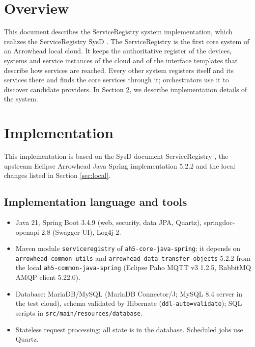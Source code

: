 \documentclass[a4paper]{arrowhead}
\begin{document}
\section{Overview}
\label{sec:overview}

This document describes the ServiceRegistry system implementation, which realizes the ServiceRegistry SysD \cite{sr-sysd}. The ServiceRegistry is the first core system of an Arrowhead local cloud. It keeps the authoritative register of the devices, systems and service instances of the cloud and of the interface templates that describe how services are reached. Every other system registers itself and its services there and finds the core services through it; orchestrators use it to discover candidate providers.
In Section \ref{Implementation}, we describe implementation details of the system.

\newpage

\section{Implementation}
\label{Implementation}

This implementation is based on the SysD document ServiceRegistry \cite{sr-sysd}, the upstream Eclipse Arrowhead Java Spring implementation 5.2.2 \cite{ah5java} and the local changes listed in Section \ref{sec:local}.

\subsection{Implementation language and tools}
\begin{itemize}
\item Java 21, Spring Boot 3.4.9 (web, security, data JPA, Quartz), springdoc-openapi 2.8 (Swagger UI), Log4j 2.
\item Maven module \texttt{serviceregistry} of \texttt{ah5-core-java-spring}; it depends on \texttt{arrowhead-common-utils} and \texttt{arrowhead-data-transfer-objects} 5.2.2 from the local \texttt{ah5-common-java-spring} (Eclipse Paho MQTT v3 1.2.5, RabbitMQ AMQP client 5.22.0).
\item Database: MariaDB/MySQL (MariaDB Connector/J; MySQL 8.4 server in the test cloud), schema validated by Hibernate (\texttt{ddl-auto=validate}); SQL scripts in \texttt{src/main/resources/database}.
\item Stateless request processing; all state is in the database. Scheduled jobs use Quartz.
\end{itemize}
\end{document}
